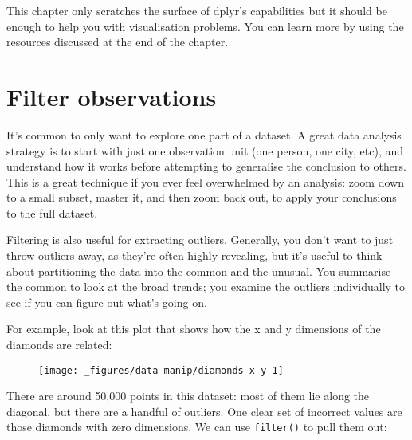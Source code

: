 This chapter only scratches the surface of dplyr's capabilities but it
should be enough to help you with visualisation problems. You can learn
more by using the resources discussed at the end of the chapter.

\section{Filter observations}\label{filter-observations}

It's common to only want to explore one part of a dataset. A great data
analysis strategy is to start with just one observation unit (one
person, one city, etc), and understand how it works before attempting to
generalise the conclusion to others. This is a great technique if you
ever feel overwhelmed by an analysis: zoom down to a small subset,
master it, and then zoom back out, to apply your conclusions to the full
dataset. 

Filtering is also useful for extracting outliers. Generally, you don't
want to just throw outliers away, as they're often highly revealing, but
it's useful to think about partitioning the data into the common and the
unusual. You summarise the common to look at the broad trends; you
examine the outliers individually to see if you can figure out what's
going on.

For example, look at this plot that shows how the x and y dimensions of
the diamonds are related:

\begin{Shaded}
\begin{Highlighting}[]
\StringTok{ }
\StringTok{  }\NormalTok{()}
\end{Highlighting}
\end{Shaded}

\begin{figure}[H]
  \centering
  \texttt{[image: \_figures/data-manip/diamonds-x-y-1]}
\end{figure}

There are around 50,000 points in this dataset: most of them lie along
the diagonal, but there are a handful of outliers. One clear set of
incorrect values are those diamonds with zero dimensions. We can use
\texttt{filter()} to pull them out:

